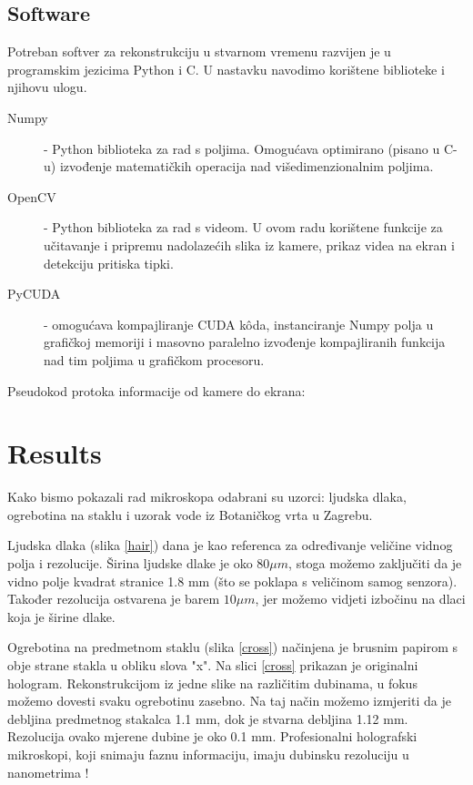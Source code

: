 \documentclass[hidelinks]{ferseminareng}
\begin{document}
	\subsection{Software}
	Potreban softver za rekonstrukciju u stvarnom vremenu razvijen je u programskim jezicima Python i C. U nastavku navodimo korištene biblioteke i njihovu ulogu.
	\begin{description}
		\item[Numpy] - Python biblioteka za rad s poljima. Omogućava optimirano (pisano u C-u) izvođenje matematičkih operacija nad višedimenzionalnim poljima.
		\item[OpenCV] - Python biblioteka za rad s videom. U ovom radu korištene funkcije za učitavanje i pripremu nadolazećih slika iz kamere, prikaz videa na ekran i detekciju pritiska tipki.
		\item[PyCUDA] - omogućava kompajliranje CUDA k\^oda, instanciranje Numpy polja u grafičkoj memoriji i masovno paralelno izvođenje kompajliranih funkcija nad tim poljima u grafičkom procesoru.
	\end{description}
	Pseudokod protoka informacije od kamere do ekrana:
	
	
	
	\section{Results}
	Kako bismo pokazali rad mikroskopa odabrani su uzorci: ljudska dlaka, ogrebotina na staklu i uzorak vode iz Botaničkog vrta u Zagrebu.
	
	Ljudska dlaka (slika \ref{hair}) dana je kao referenca za određivanje veličine vidnog polja i rezolucije. Širina ljudske dlake je oko $80 \mu{m}$, stoga možemo zaključiti da je vidno polje kvadrat stranice 1.8 mm (što se poklapa s veličinom samog senzora). Također rezolucija ostvarena je barem $10 \mu{m}$, jer možemo vidjeti izbočinu na dlaci koja je  širine dlake.
	
	Ogrebotina na predmetnom staklu (slika \ref{cross}) načinjena je brusnim papirom s obje strane stakla u obliku slova "x". Na slici \ref{cross} prikazan je originalni hologram. Rekonstrukcijom iz jedne slike na različitim dubinama, u fokus možemo dovesti svaku ogrebotinu zasebno. Na taj način možemo izmjeriti da je debljina predmetnog stakalca 1.1 mm, dok je stvarna debljina 1.12 mm. Rezolucija ovako mjerene dubine je oko 0.1 mm. Profesionalni holografski mikroskopi, koji snimaju faznu informaciju, imaju dubinsku rezoluciju u nanometrima \cite{kemper2008digital}!
	
\end{document}
